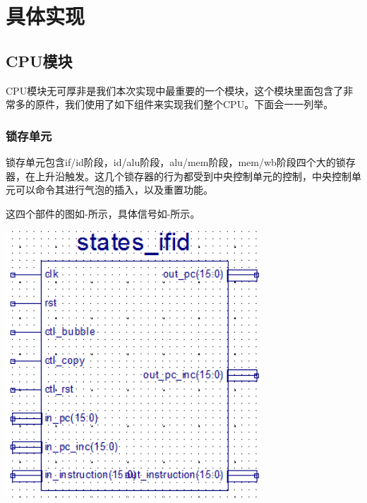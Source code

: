 \section{具体实现}

\subsection{CPU模块}

CPU模块无可厚非是我们本次实现中最重要的一个模块，这个模块里面包含了非常多的原件，我们使用了如下组件来实现我们整个CPU。下面会一一列举。

\subsubsection{锁存单元}

锁存单元包含if/id阶段，id/alu阶段，alu/mem阶段，mem/wb阶段四个大的锁存器，在上升沿触发。这几个锁存器的行为都受到中央控制单元的控制，中央控制单元可以命令其进行气泡的插入，以及重置功能。

这四个部件的图如-所示，具体信号如-所示。

\begin{center}
    \includegraphics[height=10cm]{image/detail/detail_ifid.png}
    \label{fig:ifid}
\end{center}

